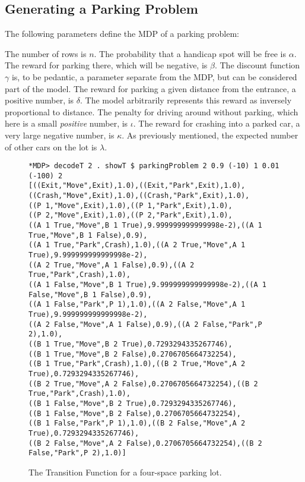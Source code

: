 \documentclass[paper=letter,pagesize=automedia,twoside=false,12pt]{scrartcl}
\theoremstyle{plain}%
\theoremstyle{definition}
\theoremstyle{remark}
\begin{document}
\subsection{Generating a Parking Problem}\label{sec:generating}

The following parameters define the MDP of a parking problem:

The number of rows is \(n\).  The probability that a handicap spot will be free is \(\alpha\).  The reward for parking there, which will be negative, is \(\beta\).  The discount function \(\gamma\) is, to be pedantic, a parameter separate from the MDP, but can be considered part of the model.  The reward for parking a given distance from the entrance, a positive number, is \(\delta\).  The model arbitrarily represents this reward as inversely proportional to distance.  The penalty for driving around without parking, which here is a small \textit{positive} number, is \(\iota\).  The reward for crashing into a parked car, a very large negative number, is \(\kappa\).  As previously mentioned, the expected number of other cars on the lot is \(\lambda\).

\begin{figure}[h!]\label{fig:transition}
\caption{The Transition Function for a four-space parking lot.}
\begin{verbatim}
*MDP> decodeT 2 . showT $ parkingProblem 2 0.9 (-10) 1 0.01 (-100) 2
[((Exit,"Move",Exit),1.0),((Exit,"Park",Exit),1.0),
((Crash,"Move",Exit),1.0),((Crash,"Park",Exit),1.0),
((P 1,"Move",Exit),1.0),((P 1,"Park",Exit),1.0),
((P 2,"Move",Exit),1.0),((P 2,"Park",Exit),1.0),
((A 1 True,"Move",B 1 True),9.999999999999998e-2),((A 1 True,"Move",B 1 False),0.9),
((A 1 True,"Park",Crash),1.0),((A 2 True,"Move",A 1 True),9.999999999999998e-2),
((A 2 True,"Move",A 1 False),0.9),((A 2 True,"Park",Crash),1.0),
((A 1 False,"Move",B 1 True),9.999999999999998e-2),((A 1 False,"Move",B 1 False),0.9),
((A 1 False,"Park",P 1),1.0),((A 2 False,"Move",A 1 True),9.999999999999998e-2),
((A 2 False,"Move",A 1 False),0.9),((A 2 False,"Park",P 2),1.0),
((B 1 True,"Move",B 2 True),0.7293294335267746),
((B 1 True,"Move",B 2 False),0.2706705664732254),
((B 1 True,"Park",Crash),1.0),((B 2 True,"Move",A 2 True),0.7293294335267746),
((B 2 True,"Move",A 2 False),0.2706705664732254),((B 2 True,"Park",Crash),1.0),
((B 1 False,"Move",B 2 True),0.7293294335267746),
((B 1 False,"Move",B 2 False),0.2706705664732254),
((B 1 False,"Park",P 1),1.0),((B 2 False,"Move",A 2 True),0.7293294335267746),
((B 2 False,"Move",A 2 False),0.2706705664732254),((B 2 False,"Park",P 2),1.0)]
\end{verbatim}
\end{figure}
\end{document}
